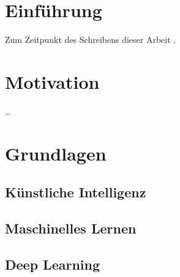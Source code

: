 \documentclass[12pt,a4paper]{article}
\newcounter{savepage}  %
\begin{document}
\newpage
{}
\setcounter{footnote}{0}
\acresetall

%
%
%

\section{Einführung}
Zum Zeitpunkt des Schreibens dieser Arbeit \parencite[vgl.][]{assembly_in_dotnet}.\cite[vgl.][]{csharp_5.0_in_a_nutshell_page_3_to_5}

\section{Motivation}
\dots

\section{Grundlagen}
\subsection{Künstliche Intelligenz}
\subsection{Maschinelles Lernen}
\subsection{Deep Learning}
\end{document}
